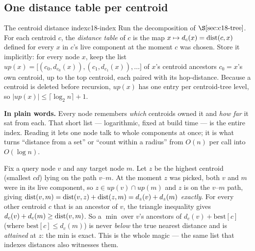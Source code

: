 \subsection{One distance table per centroid}

\begin{definition}{The centroid distance index}{c18-index}
Run the decomposition of \(\secref{c18-tree}\). For each centroid \(c\), the
\emph{distance table} of \(c\) is the map \(x \mapsto d_c(x)=\operatorname{dist}(c,x)\) defined for
every \(x\) in \(c\)'s live component at the moment \(c\) was chosen. Store it
implicitly: for every node \(x\), keep the list
\(\mathit{up}(x)=\big[(c_0,d_{c_0}(x)),(c_1,d_{c_1}(x)),\dots\big]\) of \(x\)'s centroid
ancestors \(c_0=x\)'s own centroid, up to the top centroid, each paired with its
hop-distance. Because a centroid is deleted before recursion, \(\mathit{up}(x)\) has one
entry per centroid-tree level, so \(|\mathit{up}(x)|\le\lceil\log_2 n\rceil+1\).
\end{definition}

\noindent\textbf{In plain words.} Every node remembers \emph{which} centroids owned it
and \emph{how far} it sat from each. That short list --- logarithmic, fixed at build
time --- is the entire index. Reading it lets one node talk to whole components at once;
it is what turns ``distance from a set'' or ``count within a radius'' from \(O(n)\) per
call into \(O(\log n)\).

\begin{insightbox}
Fix a query node \(v\) and any target node \(m\). Let \(z\) be the highest centroid
(smallest \(\mathit{cd}\)) lying on the path \(v\text{--}m\). At the moment \(z\) was
picked, both \(v\) and \(m\) were in its live component, so \(z\in\mathit{up}(v)\cap
\mathit{up}(m)\) and \(z\) is on the \(v\text{--}m\) path, giving
\(\operatorname{dist}(v,m)=\operatorname{dist}(v,z)+\operatorname{dist}(z,m)=d_z(v)+d_z(m)\) \emph{exactly}. For every other
centroid \(c\) that is an ancestor of \(v\), the triangle inequality gives
\(d_c(v)+d_c(m)\ge\operatorname{dist}(v,m)\). So a \(\min\) over \(v\)'s ancestors of
\(d_c(v)+\text{best}[c]\) (where \(\text{best}[c]\le d_c(m)\)) is never \emph{below} the
true nearest distance and is \emph{attained} at \(z\): the min is exact. This is the whole
magic --- the same list that indexes distances also witnesses them.
\end{insightbox}


